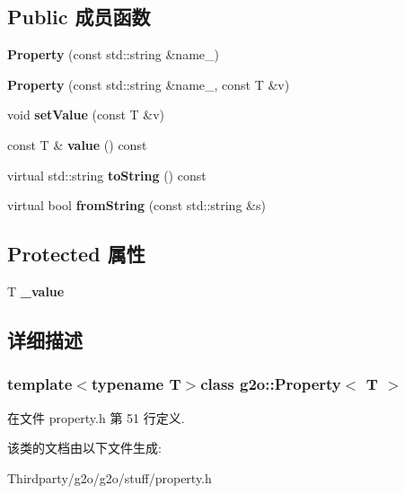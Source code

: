\subsection*{Public 成员函数}
\begin{DoxyCompactItemize}
\item 
\hypertarget{classg2o_1_1Property_a15e39f5b08067cff86d2a4f5c838aeee}{{\bfseries Property} (const std\-::string \&name\-\_\-)}\label{classg2o_1_1Property_a15e39f5b08067cff86d2a4f5c838aeee}

\item 
\hypertarget{classg2o_1_1Property_a888c7b06876668a0132e32a2a0e28311}{{\bfseries Property} (const std\-::string \&name\-\_\-, const T \&v)}\label{classg2o_1_1Property_a888c7b06876668a0132e32a2a0e28311}

\item 
\hypertarget{classg2o_1_1Property_a438d1ca338ce8c3a371654023200068d}{void {\bfseries set\-Value} (const T \&v)}\label{classg2o_1_1Property_a438d1ca338ce8c3a371654023200068d}

\item 
\hypertarget{classg2o_1_1Property_aefa3e7a5fcb2c8e061ecb07485f1371c}{const T \& {\bfseries value} () const }\label{classg2o_1_1Property_aefa3e7a5fcb2c8e061ecb07485f1371c}

\item 
\hypertarget{classg2o_1_1Property_aaa5c2e380ceca424de92d16f1d92fad6}{virtual std\-::string {\bfseries to\-String} () const }\label{classg2o_1_1Property_aaa5c2e380ceca424de92d16f1d92fad6}

\item 
\hypertarget{classg2o_1_1Property_a5c0a6eacc67e98d4f0b3fd9fe856dbbe}{virtual bool {\bfseries from\-String} (const std\-::string \&s)}\label{classg2o_1_1Property_a5c0a6eacc67e98d4f0b3fd9fe856dbbe}

\end{DoxyCompactItemize}
\subsection*{Protected 属性}
\begin{DoxyCompactItemize}
\item 
\hypertarget{classg2o_1_1Property_ae51b1fe0e0a1f0d9a2bcbef7ea3afcf7}{T {\bfseries \-\_\-value}}\label{classg2o_1_1Property_ae51b1fe0e0a1f0d9a2bcbef7ea3afcf7}

\end{DoxyCompactItemize}


\subsection{详细描述}
\subsubsection*{template$<$typename T$>$class g2o\-::\-Property$<$ T $>$}



在文件 property.\-h 第 51 行定义.



该类的文档由以下文件生成\-:\begin{DoxyCompactItemize}
\item 
Thirdparty/g2o/g2o/stuff/property.\-h\end{DoxyCompactItemize}
